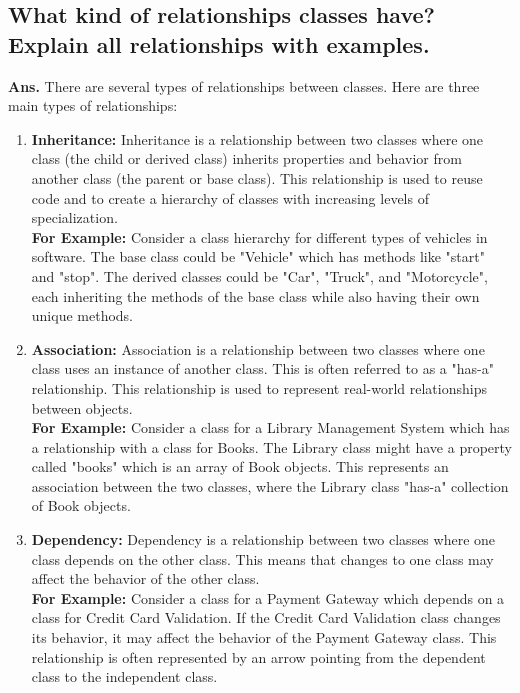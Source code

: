 \documentclass{article}
\begin{document}
\subsection{What kind of relationships classes have? Explain all relationships with examples.}
\textbf{Ans.} There are several types of relationships between classes. Here are three main types of relationships:
\begin{enumerate}
	\item \textbf{Inheritance:} Inheritance is a relationship between two classes where one class (the child or derived class) inherits properties and behavior from another class (the parent or base class). This relationship is used to reuse code and to create a hierarchy of classes with increasing levels of specialization.\\
	\textbf{For Example:} Consider a class hierarchy for different types of vehicles in software. The base class could be "Vehicle" which has methods like "start" and "stop". The derived classes could be "Car", "Truck", and "Motorcycle", each inheriting the methods of the base class while also having their own unique methods.
	\item \textbf{Association:} Association is a relationship between two classes where one class uses an instance of another class. This is often referred to as a "has-a" relationship. This relationship is used to represent real-world relationships between objects.\\
	\textbf{For Example:} Consider a class for a Library Management System which has a relationship with a class for Books. The Library class might have a property called "books" which is an array of Book objects. This represents an association between the two classes, where the Library class "has-a" collection of Book objects.
	\item \textbf{Dependency:} Dependency is a relationship between two classes where one class depends on the other class. This means that changes to one class may affect the behavior of the other class.\\
	\textbf{For Example:} Consider a class for a Payment Gateway which depends on a class for Credit Card Validation. If the Credit Card Validation class changes its behavior, it may affect the behavior of the Payment Gateway class. This relationship is often represented by an arrow pointing from the dependent class to the independent class.
\end{enumerate}
\end{document}
